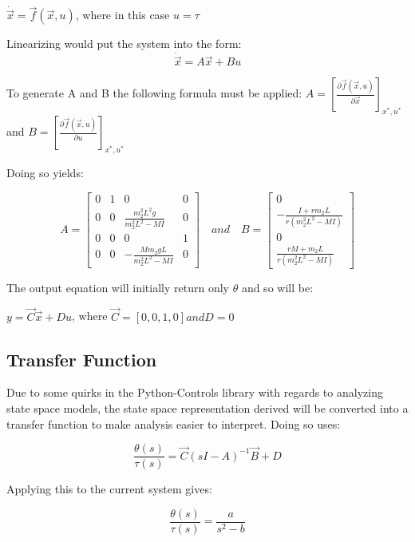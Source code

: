 \documentclass{article}
\begin{document}
	\centerline{$\dot{\vec{x}} = \vec{f}(\vec{x},u)$, where in this case $u = \tau$}
	Linearizing would put the system into the form:
	$$\dot{\vec{x}} = A\vec{x} + Bu$$
	
	To generate A and B the following formula must be applied:
	$A = \left[ \frac{\partial \vec{f}(\vec{x},u)}{\partial \vec{x}} \right]_{x^*,u^*}$ and $B = \left[ \frac{\partial \vec{f}(\vec{x},u)}{\partial u} \right]_{x^*,u^*}$
	
	Doing so yields:
	
	\begin{equation}
		\label{eqn:linSS}
		A = \begin{bmatrix}
			0 & 1 & 0 & 0	\\
			0 & 0 & \frac{m_2^2 L^2 g}{m_2^2 L^2 - MI} & 0 \\
			0 & 0 & 0 & 1	\\
			0 & 0 & -\frac{Mm_2 gL}{m_2^2 L^2 - MI} & 0
		\end{bmatrix}
		\quad and	\quad B = \begin{bmatrix}
			0	\\
			-\frac{I + rm_2 L}{r(m_2^2 L^2 - MI)}	\\
			0	\\
			\frac{rM + m_2 L}{r(m_2^2 L^2 - MI)}
		\end{bmatrix}
	\end{equation}
	
	The output equation will initially return only $\theta$ and so will be:
	
	$y = \vec{C} \vec{x} + Du$, where $\vec{C} = [0, 0, 1, 0] and D = 0$ 
	
	\subsection{Transfer Function}
	Due to some quirks in the Python-Controls library with regards to analyzing state space models, the state space representation derived will be converted into a transfer function to make analysis easier to interpret. Doing so uses:
	
	\begin{equation}
		\label{eqn:SS2TF}
		\frac{\theta (s)}{\tau (s)} = \vec{C}(sI - A)^{-1}\vec{B} + D
	\end{equation}
	
	Applying this to the current system gives:
	
	\begin{equation}
		\label{eqn:SISOTF}
		\frac{\theta (s)}{\tau (s)} = \frac{a}{s^2 - b}
	\end{equation}
	
\end{document}
